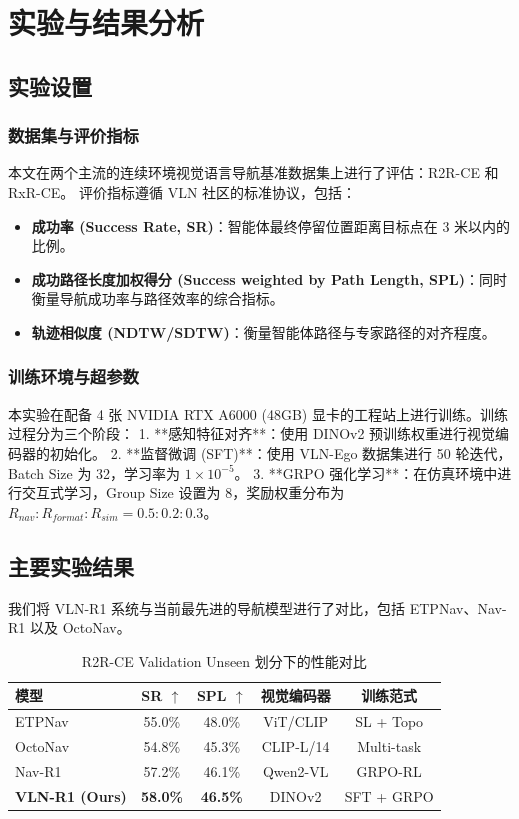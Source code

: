 \cleardoublepage

\section{实验与结果分析}

\subsection{实验设置}

\subsubsection{数据集与评价指标}
本文在两个主流的连续环境视觉语言导航基准数据集上进行了评估：R2R-CE\cite{krantz2020beyond} 和 RxR-CE\cite{ku2020rxr}。
评价指标遵循 VLN 社区的标准协议，包括：
\begin{itemize}
    \item \textbf{成功率 (Success Rate, SR)}：智能体最终停留位置距离目标点在 3 米以内的比例。
    \item \textbf{成功路径长度加权得分 (Success weighted by Path Length, SPL)}：同时衡量导航成功率与路径效率的综合指标。
    \item \textbf{轨迹相似度 (NDTW/SDTW)}：衡量智能体路径与专家路径的对齐程度。
\end{itemize}

\subsubsection{训练环境与超参数}
本实验在配备 4 张 NVIDIA RTX A6000 (48GB) 显卡的工程站上进行训练。训练过程分为三个阶段：
1. **感知特征对齐**：使用 DINOv2 预训练权重进行视觉编码器的初始化。
2. **监督微调 (SFT)**：使用 VLN-Ego 数据集进行 50 轮迭代，Batch Size 为 32，学习率为 $1 \times 10^{-5}$。
3. **GRPO 强化学习**：在仿真环境中进行交互式学习，Group Size 设置为 8，奖励权重分布为 $R_{nav}:R_{format}:R_{sim} = 0.5:0.2:0.3$。

\subsection{主要实验结果}
我们将 VLN-R1 系统与当前最先进的导航模型进行了对比，包括 ETPNav、Nav-R1 以及 OctoNav。

\begin{table}[htbp]
\centering
\caption{R2R-CE Validation Unseen 划分下的性能对比}
\label{tab:results}
\begin{tabular}{l|cc|cc}
\hline
\textbf{模型} & \textbf{SR $\uparrow$} & \textbf{SPL $\uparrow$} & \textbf{视觉编码器} & \textbf{训练范式} \\ \hline
ETPNav\cite{etpnav} & 55.0\% & 48.0\% & ViT/CLIP & SL + Topo \\
OctoNav\cite{octonav} & 54.8\% & 45.3\% & CLIP-L/14 & Multi-task \\
Nav-R1\cite{nav_r1} & 57.2\% & 46.1\% & Qwen2-VL & GRPO-RL \\ \hline
\textbf{VLN-R1 (Ours)} & \textbf{58.0\%} & \textbf{46.5\%} & DINOv2 & SFT + GRPO \\ \hline
\end{tabular}
\end{table}

